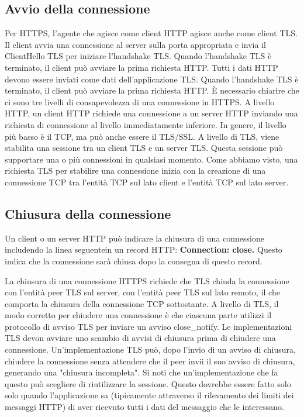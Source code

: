 \subsection{Avvio della connessione}
Per HTTPS, l'agente che agisce come client HTTP agisce anche come client TLS. Il client avvia una connessione al server sulla porta appropriata e invia il ClientHello TLS per iniziare l'handshake TLS. Quando l'handshake TLS è terminato, il client può avviare la prima richiesta HTTP. Tutti i dati HTTP devono essere inviati come dati dell'applicazione TLS. Quando l'handshake TLS è terminato, il client può avviare la prima richiesta HTTP. È necessario chiarire che ci sono tre livelli di consapevolezza di una connessione in HTTPS. A livello HTTP, un client HTTP richiede una connessione a un server HTTP inviando una richiesta di connessione al livello immediatamente inferiore. In genere, il livello più basso è il TCP, ma può anche essere il TLS/SSL. A livello di TLS, viene stabilita una sessione tra un client TLS e un server TLS. Questa sessione può supportare una o più connessioni in qualsiasi momento. Come abbiamo visto, una richiesta TLS per stabilire una connessione inizia con la creazione di una connessione TCP tra l'entità TCP sul lato client e l'entità TCP sul lato server. 

\subsection{Chiusura della connessione}
Un client o un server HTTP può indicare la chiusura di una connessione includendo la linea seguentein un record HTTP: \textbf{Connection: close.} Questo indica che la connessione sarà chiusa dopo la consegna di questo record.

\singlespacing

La chiusura di una connessione HTTPS richiede che TLS chiuda la connessione con l'entità peer TLS sul server, con l'entità peer TLS sul lato remoto, il che comporta la chiusura della connessione TCP sottostante.
A livello di TLS, il modo corretto per chiudere una connessione è che ciascuna parte utilizzi il protocollo di avviso TLS per inviare un avviso close\_notify. Le implementazioni TLS devon avviare uno scambio di avvisi di chiusura prima di chiudere una connessione.  Un'implementazione TLS può, dopo l'invio di un avviso di chiusura, chiudere la connessione senza attendere che il peer invii il suo avviso di chiusura, generando una "chiusura incompleta". Si noti che 
un'implementazione che fa questo può scegliere di riutilizzare la sessione. Questo dovrebbe essere fatto solo
solo quando l'applicazione sa (tipicamente attraverso il rilevamento dei limiti dei messaggi HTTP) di aver ricevuto tutti i dati del messaggio che le interessano.

